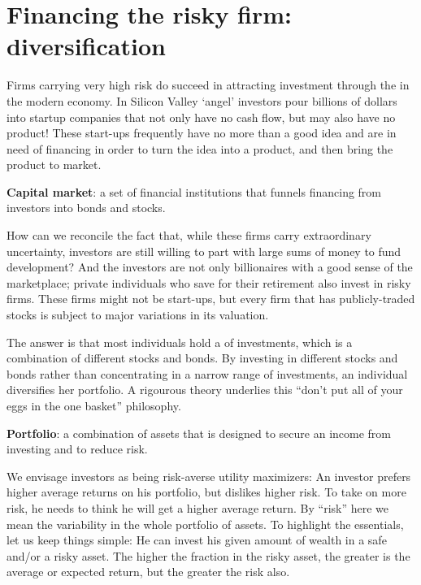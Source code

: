 \section{Financing the risky firm: diversification} \label{sec:diversification}

Firms carrying very high risk do succeed in attracting investment through the  in the modern economy. In Silicon Valley `angel' investors pour billions of dollars into startup companies that not only have no cash flow, but may also have no product! These start-ups frequently have no more than a good idea and are in need of financing in order to turn the idea into a product, and then bring the product to market. 

\begin{DefBox}
\textbf{Capital market}: a set of financial institutions that funnels financing from investors into bonds and stocks.
\end{DefBox}

How can we reconcile the fact that, while these firms carry extraordinary uncertainty, investors are still willing to part with large sums of money to fund development? And the investors are not only billionaires with a good sense of the marketplace; private individuals who save for their retirement also invest in risky firms. These firms might not be start-ups, but every firm that has publicly-traded stocks is subject to major variations in its valuation. 

The answer is that most individuals hold a  of investments, which is a combination of different stocks and bonds. By investing in different stocks and bonds rather than concentrating in a narrow range of investments, an individual diversifies her portfolio. A rigourous theory underlies this ``don't put all of your eggs in the one basket'' philosophy.

\begin{DefBox}
\textbf{Portfolio}: a combination of assets that is designed to secure an income from investing and to reduce risk.
\end{DefBox}

We envisage investors as being risk-averse utility maximizers: An investor prefers higher average returns on his portfolio, but dislikes higher risk. To take on more risk, he needs to think he will get a higher average return. By ``risk'' here we mean the variability in the whole portfolio of assets. To highlight the essentials, let us keep things simple: He can invest his given amount of wealth in a safe and/or a risky asset. The higher the fraction in the risky asset, the greater is the average or expected return, but the greater the risk also.

